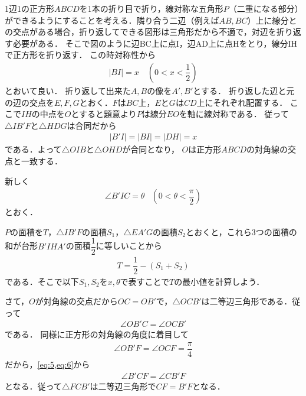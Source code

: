 \documentclass[../../main.tex]{subfiles}
\begin{document}
1辺1の正方形$ABCD$を1本の折り目で折り，線対称な五角形$P$（二重になる部分）ができるようにすることを考える．隣り合う二辺（例えば$AB,BC$）上に線分との交点がある場合，折り返してできる図形は三角形だから不適で，対辺を折り返す必要がある．
そこで図のように辺BC上に点I，辺AD上に点Hをとり，線分IHで正方形を折り返す．
この時対称性から
\begin{align}
  |BI| = x \quad \left(0 < x < \dfrac{1}{2}\right) \label{eq:1}
\end{align}
とおいて良い．
折り返して出来た$A, B$の像を$A', B'$とする．
折り返した辺と元の辺の交点を$E,F,G$とおく．$F$は$BC$上，$E$と$G$は$CD$上にそれぞれ配置する．
ここで$IH$の中点を$O$とすると題意より$P$は線分$EO$を軸に線対称である．
従って$\triangle IB'F$と$\triangle HDG$は合同だから
\begin{align}
  |B'I| = |BI| = |DH| = x \label{eq:2}
\end{align}
である．よって$\triangle OIB$と$\triangle OHD$が合同となり，
$O$は正方形$ABCD$の対角線の交点と一致する．

新しく
\begin{align}
  \angle B'IC = \theta & \left(0 < \theta < \dfrac{\pi}{2}\right)\label{eq:3}
\end{align}
とおく．

$P$の面積を$T$，$\triangle IB'F$の面積$S_1$，$\triangle EA'G$の面積$S_2$とおくと，これら3つの面積の和が台形$B'IHA'$の面積$\dfrac{1}{2}$に等しいことから
\begin{align}
  T=\dfrac{1}{2}-(S_1+S_2) \label{eq:4}
\end{align}
である．そこで以下$S_1,S_2$を$x,\theta$で表すことで$T$の最小値を計算しよう．

さて，$O$が対角線の交点だから$OC=OB'$で，$\triangle OCB'$は二等辺三角形である．従って
\begin{align}
  \angle OB'C=\angle OCB' \label{eq:5}
\end{align}
である．
同様に正方形の対角線の角度に着目して
\begin{align}
  \angle OB'F=\angle OCF=\dfrac{\pi}{4} \label{eq:6}
\end{align}
だから，\cref{eq:5,eq:6}から
\begin{align}
  \angle B'CF=\angle CB'F
\end{align}
となる．従って$\triangle FCB'$は二等辺三角形で$CF=B'F$となる．
\end{document}
